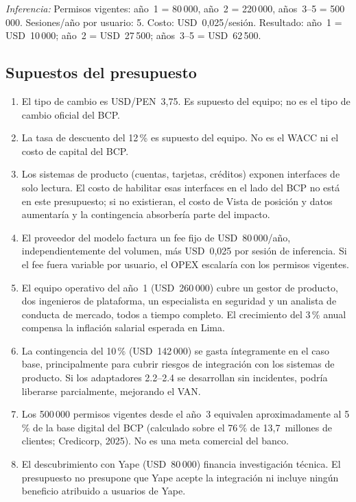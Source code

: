 \documentclass[11pt]{article}
\newcommand{\usd}[1]{USD~#1}
\begin{document}
\vspace{0.3em}
{\small\textit{Inferencia:} Permisos vigentes: año~1 = 80\,000, año~2 = 220\,000, años~3–5 = 500\,000. Sesiones/año por usuario: 5. Costo: \usd{0,025}/sesión. Resultado: año~1 = \usd{10\,000}; año~2 = \usd{27\,500}; años~3–5 = \usd{62\,500}.}

\subsection{Supuestos del presupuesto}

\begin{enumerate}
\item El tipo de cambio es USD/PEN~3,75. Es supuesto del equipo; no es el tipo de cambio oficial del BCP.
\item La tasa de descuento del 12\,\% es supuesto del equipo. No es el WACC ni el costo de capital del BCP.
\item Los sistemas de producto (cuentas, tarjetas, créditos) exponen interfaces de solo lectura. El costo de habilitar esas interfaces en el lado del BCP no está en este presupuesto; si no existieran, el costo de Vista de posición y datos aumentaría y la contingencia absorbería parte del impacto.
\item El proveedor del modelo factura un fee fijo de \usd{80\,000}/año, independientemente del volumen, más \usd{0,025} por sesión de inferencia. Si el fee fuera variable por usuario, el OPEX escalaría con los permisos vigentes.
\item El equipo operativo del año~1 (\usd{260\,000}) cubre un gestor de producto, dos ingenieros de plataforma, un especialista en seguridad y un analista de conducta de mercado, todos a tiempo completo. El crecimiento del 3\,\% anual compensa la inflación salarial esperada en Lima.
\item La contingencia del 10\,\% (\usd{142\,000}) se gasta íntegramente en el caso base, principalmente para cubrir riesgos de integración con los sistemas de producto. Si los adaptadores 2.2–2.4 se desarrollan sin incidentes, podría liberarse parcialmente, mejorando el VAN.
\item Los 500\,000 permisos vigentes desde el año~3 equivalen aproximadamente al 5\,\% de la base digital del BCP (calculado sobre el 76\,\% de 13,7~millones de clientes; Credicorp, 2025). No es una meta comercial del banco.
\item El descubrimiento con Yape (\usd{80\,000}) financia investigación técnica. El presupuesto no presupone que Yape acepte la integración ni incluye ningún beneficio atribuido a usuarios de Yape.

\end{enumerate}
\end{document}
